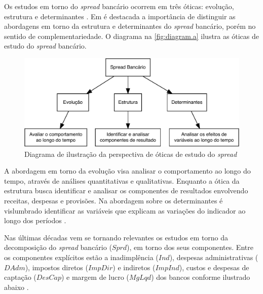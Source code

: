 \documentclass[
  12pt,
  12pt,
  openright,
  oneside,
  a4paper,
  chapter=TITLE,
  section=TITLE,
  subsection=TITLE,
  subsubsection=TITLE,
  english,
  portugues,
  sumario=tradicional]{abntex2}
\begin{document}
Os estudos em torno do \emph{spread} bancário ocorrem em três óticas: evolução, estrutura e determinantes \cite{dick:1999}. Em \textcite{dick:1999} é destacada a importância de distinguir as abordagens em torno da estrutura e determinantes do \emph{spread} bancário, porém no sentido de complementariedade. O diagrama na \autoref{fig:diagram.a} ilustra as óticas de estudo do \emph{spread} bancário.

\begin{figure}[!htbp]
\vspace{20pt}
\caption{Diagrama de ilustração da perspectiva de óticas de estudo do \emph{spread}}
\vspace{-4mm}

\begin{center}\includegraphics{12-exportedfigures/diagram.spread.otic-1} \end{center}
\vspace{-3mm}
\label{fig:diagram.a}
\vspace{-2mm}
\end{figure}

A abordagem em torno da evolução visa analisar o comportamento ao longo do tempo, através de análises quantitativas e qualitativas. Enquanto a ótica da estrutura busca identificar e analisar os componentes de resultados envolvendo receitas, despesas e provisões. Na abordagem sobre os determinantes é vislumbrado identificar as variáveis que explicam as variações do indicador ao longo dos períodos \cite{dick:1999}.

Nas últimas décadas vem se tornando relevantes os estudos em torno da decomposição do \emph{spread} bancário (\(Sprd\)), em torno dos seus componentes. Entre os componentes explícitos estão a inadimplência (\(Ind\)), despesas administrativas (\(DAdm\)), impostos diretos (\(ImpDir\)) e indiretos (\(ImpInd\)), custos e despesas de captação (\(DesCap\)) e margem de lucro (\(MgLqd\)) dos bancos conforme ilustrado abaixo \cite{BCB:2000, BCB:1999}.
\end{document}
